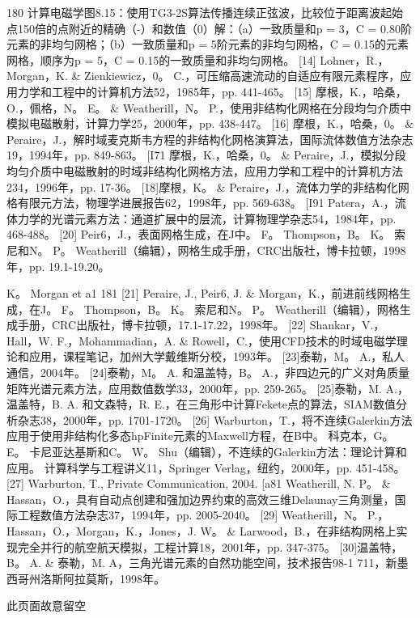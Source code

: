 \documentclass[UTF8,11pt,a4paper,openany,fontset=fandol]{ctexbook}
\begin{document}
180 计算电磁学图8.15：使用TG3-2S算法传播连续正弦波，比较位于距离波起始点150倍的点附近的精确（-）和数值（0）解：（a）一致质量和p = 3，C = 0.80阶元素的非均匀网格；（b）一致质量和p = 5阶元素的非均匀网格，C = 0.15的元素网格，顺序为p = 5，C = 0.15的一致质量和非均匀网格。 [14] Lohner，R.，Morgan，K. \& Zienkiewicz，0。 C.，可压缩高速流动的自适应有限元素程序，应用力学和工程中的计算机方法52，1985年，pp. 441-465。 [15] 摩根，K.，哈桑，O.，佩格，N。 E。 \& Weatherill，N。 P.，使用非结构化网格在分段均匀介质中模拟电磁散射，计算力学25，2000年，pp. 438-447。 [16] 摩根，K.，哈桑，0。 \& Peraire，J.，解时域麦克斯韦方程的非结构化网格演算法，国际流体数值方法杂志19，1994年，pp. 849-863。 [I71 摩根，K.，哈桑，0。 \& Peraire，J.，模拟分段均匀介质中电磁散射的时域非结构化网格方法，应用力学和工程中的计算机方法234，1996年，pp. 17-36。 [18]摩根，K。 \& Peraire，J.，流体力学的非结构化网格有限元方法，物理学进展报告62，1998年，pp. 569-638。 [I91 Patera，A.，流体力学的光谱元素方法：通道扩展中的层流，计算物理学杂志54，1984年，pp. 468-488。 [20] Peir6，J.，表面网格生成，在J中。 F。 Thompson，B。 K。 索尼和N。 P。 Weatherill（编辑），网格生成手册，CRC出版社，博卡拉顿，1998年，pp. 19.1-19.20。

K。 Morgan et a1 181 [21] Peraire, J., Peir6, J. \& Morgan，K.，前进前线网格生成，在J。 F。 Thompson，B。 K。 索尼和N。 P。 Weatherill（编辑），网格生成手册，CRC出版社，博卡拉顿，17.1-17.22，1998年。 [22] Shankar，V.，Hall，W. F.，Mohammadian，A. \& Rowell，C.，使用CFD技术的时域电磁学理论和应用，课程笔记，加州大学戴维斯分校，1993年。 [23]泰勒，M。 A.，私人通信，2004年。 [24]泰勒，M。 A. 和温盖特，B。 A.，非四边元的广义对角质量矩阵光谱元素方法，应用数值数学33，2000年，pp. 259-265。 [25]泰勒，M. A.，温盖特，B. A. 和文森特，R. E.，在三角形中计算Fekete点的算法，SIAM数值分析杂志38，2000年，pp. 1701-1720。 [26] Warburton，T.，将不连续Galerkin方法应用于使用非结构化多态hpFinite元素的Maxwell方程，在B中。 科克本，G。 E。 卡尼亚达基斯和C。 W。 Shu（编辑），不连续的Galerkin方法：理论计算和应用。 计算科学与工程讲义11，Springer Verlag，纽约，2000年，pp. 451-458。 [27] Warburton, T., Private Communication, 2004. [a81 Weatherill, N. P。 \& Hassan，O.，具有自动点创建和强加边界约束的高效三维Delaunay三角测量，国际工程数值方法杂志37，1994年，pp. 2005-2040。 [29] Weatherill，N。 P.，Hassan，O.，Morgan，K.，Jones，J. W。 \& Larwood，B.，在非结构网格上实现完全并行的航空航天模拟，工程计算18，2001年，pp. 347-375。 [30]温盖特，B。 A. \& 泰勒，M. A，三角光谱元素的自然功能空间，技术报告98-1 711，新墨西哥州洛斯阿拉莫斯，1998年。

此页面故意留空
\end{document}
